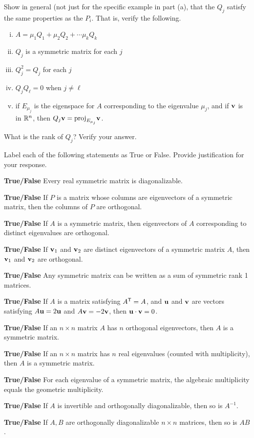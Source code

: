 	\item Show in general (not just for the specific example in part (a), that the $Q_j$ satisfy the same properties as the $P_i$. That is, verify the following.
		\begin{enumerate}[i.]
		\item $A = \mu_1 Q_1 + \mu_2 Q_2 + \cdots \mu_k Q_k$
		\item $Q_j$ is a symmetric matrix for each $j$
		\item $Q_j^2 = Q_j$ for each $j$
		\item $Q_j Q_{\ell} = 0$ when $j \neq \ell$
		\item if $E_{\mu_j}$ is the eigenspace for $A$ corresponding to the eigenvalue $\mu_j$, and if $\mathbf{v}$ is in $\mathbb{R}^n$, then $Q_j \mathbf{v} = \text{proj}_{E_{\mu_j}} \mathbf{v}$. 
		\end{enumerate}
		
	\item What is the rank of $Q_j$? Verify your answer. 
	
	\ea

\item Label each of the following statements as True or False. Provide justification for your response.
	\ba
	\item \textbf{True/False} Every real symmetric matrix is diagonalizable.
	\item \textbf{True/False} If $P$ is a matrix whose columns are eigenvectors of a symmetric matrix, then the columns of $P$ are orthogonal. 
	\item \textbf{True/False} If $A$ is a symmetric matrix, then eigenvectors of $A$ corresponding to distinct eigenvalues are orthogonal. 
	\item \textbf{True/False} If $\mathbf{v}_1$ and $\mathbf{v}_2$ are distinct eigenvectors of a symmetric matrix $A$, then $\mathbf{v}_1$ and $\mathbf{v}_2$ are orthogonal.  
	\item \textbf{True/False} Any symmetric matrix can be written as a sum of symmetric rank 1 matrices. 
	\item \textbf{True/False}  If $A$ is a matrix satisfying $A^{\mathsf{T}} = A$, and $\mathbf{u}$ and $\mathbf{v}$ are vectors satisfying $A \mathbf{u} = 2 \mathbf{u}$ and $A \mathbf{v} = -2 \mathbf{v}$, then $\mathbf{u} \cdot \mathbf{v} = 0$. 
\item \textbf{True/False} If an $n\times n$ matrix $A$ has $n$ orthogonal eigenvectors, then $A$ is a symmetric matrix.
\item \textbf{True/False} If an $n\times n$ matrix has $n$ real eigenvalues (counted with multiplicity), then $A$ is a symmetric matrix.
\item \textbf{True/False} For each eigenvalue of a symmetric matrix, the algebraic multiplicity equals the geometric multiplicity.
\item \textbf{True/False} If $A$ is invertible and orthogonally diagonalizable, then so is $A^{-1}$.
\item \textbf{True/False} If $A, B$ are orthogonally diagonalizable $n\times n$ matrices, then so is $AB$.
	\ea
	
